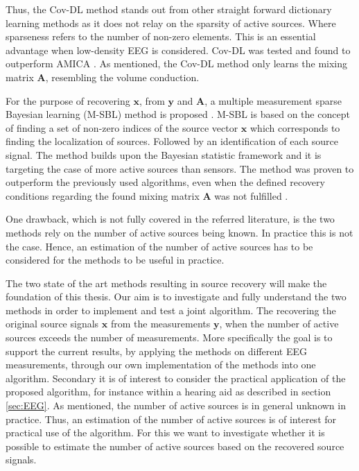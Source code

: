 Thus, the Cov-DL method stands out from other straight forward dictionary learning methods as it does not relay on the sparsity of active sources. Where sparseness refers to the number of non-zero elements. This is an essential advantage when low-density EEG is considered. 
Cov-DL was tested and found to outperform AMICA \cite{Balkan2015}. 
As mentioned, the Cov-DL method only learns the mixing matrix $\mathbf{A}$, resembling the volume conduction.

For the purpose of recovering $\mathbf{x}$, from $\mathbf{y}$ and $\mathbf{A}$, a multiple measurement sparse Bayesian learning (M-SBL) method is proposed \cite{Balkan2014}. M-SBL is based on the concept of finding a set of non-zero indices of the source vector $\mathbf{x}$ which corresponds to finding the localization of sources. Followed by an identification of each source signal. The method builds upon the Bayesian statistic framework and it is targeting the case of more active sources than sensors.
The method was proven to outperform the previously used algorithms, even when the defined recovery conditions regarding the found mixing matrix $\mathbf{A}$ was not fulfilled \cite{Balkan2014}.

One drawback, which is not fully covered in the referred literature, is the two methods rely on the number of active sources being known. 
In practice this is not the case. 
Hence, an estimation of the number of active sources has to be considered for the methods to be useful in practice.

The two state of the art methods resulting in source recovery will make the foundation of this thesis. 
Our aim is to investigate and fully understand the two methods in order to implement and test a joint algorithm. The recovering the original source signals $\mathbf{x}$ from the measurements $\mathbf{y}$, when the number of active sources exceeds the number of measurements. More specifically the goal is to support the current results, by applying the methods on different EEG measurements, through our own implementation of the methods into one algorithm. 
Secondary it is of interest to consider the practical application of the proposed algorithm, for instance within a hearing aid as described in section \ref{sec:EEG}. 
As mentioned, the number of active sources is in general unknown in practice.
Thus, an estimation of the number of active sources is of interest for practical use of the algorithm. 
For this we want to investigate whether it is possible to estimate the number of active sources based on the recovered source signals. 

